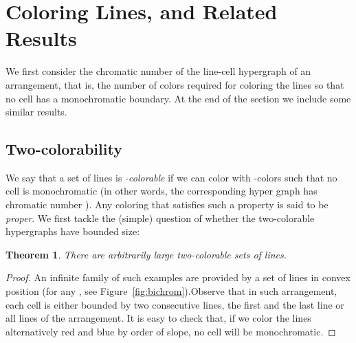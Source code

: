 \documentclass[11pt,a4paper]{article}
\newtheorem{theorem}{Theorem}
\newtheorem{open}{Open Problem}
\newcommand{\sholong}[2]{#2}
\begin{document}
\section{Coloring Lines, and Related Results}\label{sec:coloring}

We first consider the chromatic number of the line-cell hypergraph of an arrangement, that is, the number of colors required for coloring the lines so that no cell has a monochromatic boundary. At the end of the section we include some similar results.

\subsection{Two-colorability}

We say that a set of lines  is {\em -colorable} if we can color  with -colors such that no cell is monochromatic (in other words, the corresponding  hyper graph has chromatic number ). Any coloring  that satisfies such a property is said to be {\em proper}. We first tackle the (simple) question of whether the two-colorable  hypergraphs have bounded size:

\begin{theorem}\label{prop:2colors}
There are arbitrarily large two-colorable sets of lines.
\end{theorem}



\begin{proof} An infinite family of such examples are provided by a set of  lines in convex position (for any \sholong{)}{, see Figure~\ref{fig:bichrom})}.Observe that in such arrangement, each cell is either bounded by  two consecutive lines,  the first and the last line or  all lines of the arrangement. It is easy to check that, if we color the lines alternatively red and blue by order of slope, no cell will be monochromatic.
\end{proof}

\begin{comment}
It is easy to find arbitrarily large arrangements of lines that are not two colorable. Hence,  a natural question --so far elusive to us-- arising from the previous result, is to determine if a given arrangement is two colorable.
\begin{open}
Is it NP-hard to decide if a set of lines can be two-colored avoiding monochromatic cells?
\end{open}
\end{comment}
\end{document}

